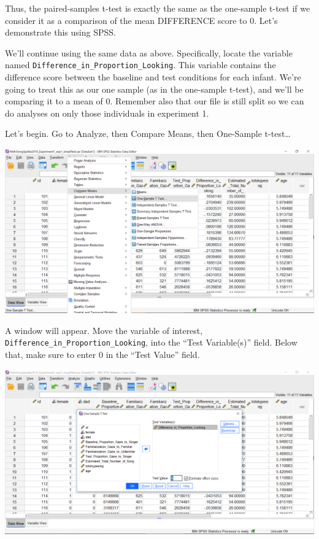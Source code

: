 \documentclass[]{book}
\begin{document}
Thus, the paired-samples t-test is exactly the same as the one-sample
t-test if we consider it as a comparison of the mean DIFFERENCE score to
0. Let's demonstrate this using SPSS.

We'll continue using the same data as above. Specifically, locate the
variable named \texttt{Difference\_in\_Proportion\_Looking}. This
variable contains the difference score between the baseline and test
conditions for each infant. We're going to treat this as our one sample
(as in the one-sample t-test), and we'll be comparing it to a mean of 0.
Remember also that our file is still split so we can do analyses on only
those individuals in experiment 1.

Let's begin. Go to {Analyze}, then {Compare Means}, then {One-Sample
t-test\ldots{}}

\includegraphics{img/6.4.31.png}

A window will appear. Move the variable of interest,
\texttt{Difference\_in\_Proportion\_Looking}, into the ``Test
Variable(s)'' field. Below that, make sure to enter 0 in the ``Test
Value'' field.

\includegraphics{img/6.4.32.png}
\end{document}
